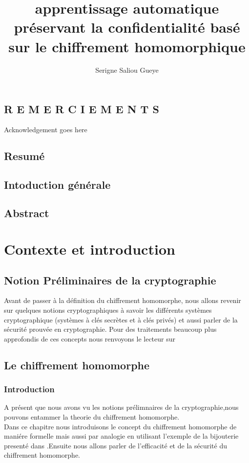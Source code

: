 \documentclass[12pt]{report}
\title{apprentissage automatique préservant la confidentialité basé sur le chiffrement  homomorphique}
\author{Serigne Saliou Gueye }
\begin{document}
\chapter*{R E M E R C I E M E N T S}
Acknowledgement goes here
\chapter*{Resumé}
\chapter*{Intoduction générale}
\chapter*{Abstract}
\tableofcontents

\part{Contexte et introduction}
\chapter{Notion Préliminaires de la cryptographie}
Avant de passer à la définition du chiffrement homomorphe, nous allons revenir sur quelques notions cryptographiques à savoir les différents systèmes cryptographique (systèmes à clés secrètes et à clés privés) et aussi parler de la sécurité prouvée en cryptographie. Pour des traitements beaucoup plus approfondis de ces concepts nous renvoyons le lecteur sur \cite{1}

\chapter{Le chiffrement homomorphe}
\section{Introduction}
A présent que nous avons vu les notions prélimnaires de la cryptographie,nous pouvons entammer  la theorie du chiffrement homomorphe.\\
Dans ce chapitre nous introduisons le concept du chiffrement homomorphe de maniére formelle mais aussi par analogie en utilisant  l'exemple  de la  bijouterie presenté dans \cite{3} .Ensuite nous allons parler de l'efficacité et de la sécurité du chiffrement homomorphe.\\

\\
\\
\end{document}
